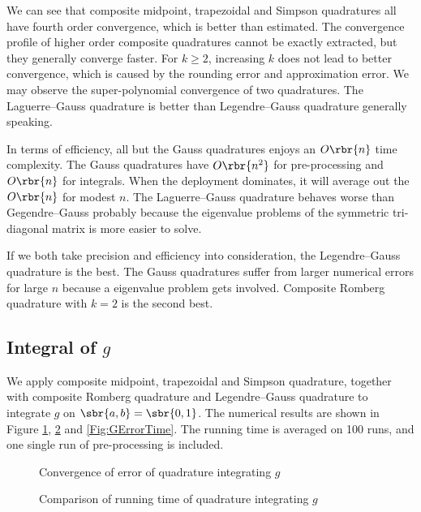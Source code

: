 \documentclass[english, nochinese]{pnote}
\begin{document}
We can see that composite midpoint, trapezoidal and Simpson quadratures all have fourth order convergence, which is better than estimated. The convergence profile of higher order composite quadratures cannot be exactly extracted, but they generally converge faster. For $ k \ge 2 $, increasing $k$ does not lead to better convergence, which is caused by the rounding error and approximation error. We may observe the super-polynomial convergence of two quadratures. The Laguerre--Gauss quadrature is better than Legendre--Gauss quadrature generally speaking.

In terms of efficiency, all but the Gauss quadratures enjoys an $ O \rbr{n} $ time complexity. The Gauss quadratures have $ O \rbr{n^2} $ for pre-processing and $ O \rbr{n} $ for integrals. When the deployment dominates, it will average out the $ O \rbr{n} $ for modest $n$. The Laguerre--Gauss quadrature behaves worse than Gegendre--Gauss probably because the eigenvalue problems of the symmetric tri-diagonal matrix is more easier to solve.

If we both take precision and efficiency into consideration, the Legendre--Gauss quadrature is the best. The Gauss quadratures suffer from larger numerical errors for large $n$ because a eigenvalue problem gets involved. Composite Romberg quadrature with $ k = 2 $ is the second best.

\subsection{Integral of $g$}

We apply composite midpoint, trapezoidal and Simpson quadrature, together with composite Romberg quadrature and Legendre--Gauss quadrature to integrate $g$ on $ \sbr{ a, b } = \sbr{ 0, 1 } $. The numerical results are shown in Figure \ref{Fig:GError}, \ref{Fig:GTime} and \ref{Fig:GErrorTime}. The running time is averaged on 100 runs, and one single run of pre-processing is included.

\begin{figure}
\centering
\scalebox{0.70}{}
\caption{Convergence of error of quadrature integrating $g$}
\label{Fig:GError}
\end{figure}

\begin{figure}
\centering
\scalebox{0.70}{}
\caption{Comparison of running time of quadrature integrating $g$}
\label{Fig:GTime}
\end{figure}
\end{document}
